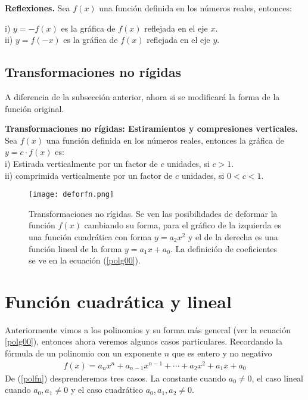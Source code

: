 \begin{mydef}
\textbf{Reflexiones.} Sea $f(x)$ una función definida en los números reales, entonces:

\noindent i) $y=-f(x)$ es la gráfica de $f(x)$ reflejada en el eje $x$.\\
\noindent ii) $y=f(-x)$ es la gráfica de $f(x)$ reflejada en el eje $y$. \\
\end{mydef}
\subsection{Transformaciones no rígidas}
A diferencia de la subsección anterior, ahora si se modificará la forma de la función original. 
\begin{mydef}
\textbf{Transformaciones no rígidas: Estiramientos y compresiones verticales.} Sea $f(x)$ una función definida en los números reales, entonces la gráfica de $y=c\cdot f(x)$ es:\\

\noindent i) Estirada verticalmente por un factor de $c$ unidades, si $c>1$.\\

\noindent ii) comprimida verticalmente por un factor de $c$ unidades, si $0<c<1$.\\
\end{mydef}

\begin{center}
\begin{figure}[h!]
\centering
\texttt{[image: deforfn.png]}
\caption[Transformaciones no rígidas.]{Transformaciones no rígidas. Se ven las posibilidades de deformar la función $f(x)$ cambiando su forma, para el gráfico de la izquierda es una función cuadrática con forma $y=a_{2}x^{2}$ y el de la derecha es una función lineal de la forma $y=a_{1}x+a_{0}$. La definición de coeficientes se ve en la ecuación (\ref{polg00}).}
\label{deforfx}
\end{figure}
\end{center}

\section{Función cuadrática y lineal}
\label{fnlincua}
Anteriormente vimos a los polinomios y su forma más general (ver la ecuación  \ref{polg00}), entonces ahora veremos algunos casos particulares. Recordando la fórmula de un polinomio con un exponente $n$ que es entero y no negativo
\begin{eqnarray}
f(x)=a_{n}x^{n}+a_{n-1}x^{n-1}+\cdots +a_{2}x^{2}+a_{1}x+a_{0}
\label{polfn}
\end{eqnarray}
De (\ref{polfn}) desprenderemos tres casos. La constante cuando $a_{0}\neq 0$, el caso lineal cuando $a_{0},a_{1}\neq 0$ y el caso cuadrático $a_{0},a_{1}, a_{2}\neq 0$.

